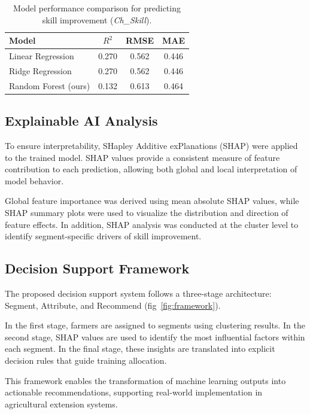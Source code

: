\begin{table}[ht]
\centering
\caption{Model performance comparison for predicting skill improvement (\textit{Ch\_Skill}).}
\label{tab:baseline_performance}
\begin{tabular}{lccc}
\hline
\textbf{Model} & \textbf{$R^{2}$} & \textbf{RMSE} & \textbf{MAE} \\
\hline
Linear Regression      & 0.270 & 0.562 & 0.446 \\
Ridge Regression       & 0.270 & 0.562 & 0.446 \\
Random Forest (ours)   & 0.132 & 0.613 & 0.464 \\
\hline
\end{tabular}
\end{table}


\subsection{Explainable AI Analysis}

To ensure interpretability, SHapley Additive exPlanations (SHAP) were applied to the trained model. SHAP values provide a consistent measure of feature contribution to each prediction, allowing both global and local interpretation of model behavior.

Global feature importance was derived using mean absolute SHAP values, while SHAP summary plots were used to visualize the distribution and direction of feature effects. In addition, SHAP analysis was conducted at the cluster level to identify segment-specific drivers of skill improvement.

\subsection{Decision Support Framework}

The proposed decision support system follows a three-stage architecture: Segment, Attribute, and Recommend (fig~\ref{fig:framework}).

In the first stage, farmers are assigned to segments using clustering results. In the second stage, SHAP values are used to identify the most influential factors within each segment. In the final stage, these insights are translated into explicit decision rules that guide training allocation.

This framework enables the transformation of machine learning outputs into actionable recommendations, supporting real-world implementation in agricultural extension systems.


